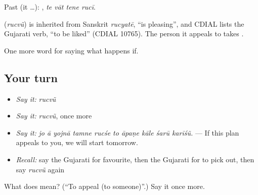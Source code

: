 Past (it …):    , \emph{te vāt tene rucī}.

\begin{cousinweb}
\textbf{} (\emph{rucvũ}) is inherited from Sanskrit \emph{rucyatē}, \textquotedblleft{}is pleasing\textquotedblright{}, and CDIAL lists the Gujarati verb, \textquotedblleft{}to be liked\textquotedblright{} (CDIAL 10765). The person it appeals to takes \textbf{}.
\end{cousinweb}

\begin{grammarlens}[title={What you've built}]
One more word for saying what happens if.
\end{grammarlens}

\subsection*{Your turn}
\begin{itemize}
\raggedright
  \item \emph{Say it:} \emph{rucvũ}
  \item \emph{Say it:} \emph{rucvũ}, once more
  \item \emph{Say it:} \emph{jo ā yojnā tamne rucśe to āpaṇe kāle śarū karīśũ.} — If this plan appeals to you, we will start tomorrow.
  \item \emph{Recall:} say the Gujarati for favourite, then the Gujarati for to pick out, then say \emph{rucvũ} again
\end{itemize}

\begin{tcolorbox}[breakable,colback=teal!4,colframe=teal!35!black,title={Before you move on}]
What does  mean? (\textquotedblleft{}To appeal (to someone)\textquotedblright{}.) Say it once more.
\end{tcolorbox}
